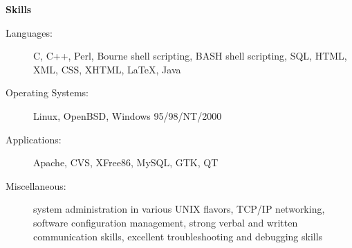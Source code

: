 \documentclass[11pt]{article}
\begin{document}
{\large \textbf{Skills}}

\begin{description}
\item[Languages:]
C, C++, Perl, Bourne shell scripting, BASH shell scripting, SQL, HTML, XML, CSS, XHTML, \LaTeX, Java
\item[Operating Systems:]
Linux, OpenBSD, Windows 95/98/NT/2000
\item[Applications:]
Apache, CVS, XFree86, MySQL, GTK, QT
\item[Miscellaneous:]
system administration in various UNIX flavors, TCP/IP networking, software configuration management, strong verbal and written communication skills, excellent troubleshooting and debugging skills
\end{description}
\end{document}
